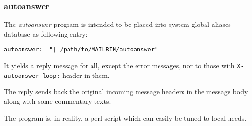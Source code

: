 \subsubsection{autoanswer}



The {\em autoanswer\/} program is intended to be placed into
system global aliases database as following entry:

\begin{tscreen}
\begin{verbatim}
autoanswer:  "| /path/to/MAILBIN/autoanswer"
\end{verbatim}
\end{tscreen}


It yields a reply message for all, except the error messages, nor
to those with {\tt X-autoanswer-loop:} header in them.

The reply sends back the original incoming message headers in the
message body along with some commentary texts.

The program is, in reality, a perl script which can easily be tuned
to local needs.

